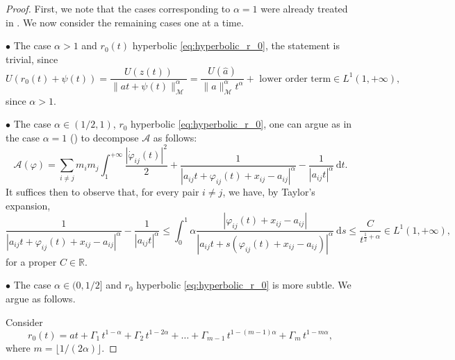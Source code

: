 \documentclass[a4paper,10pt]{amsart}
\newcommand{\numberset}{\mathbb}
\newcommand{\R}{\numberset{R}}
\newcommand{\ud}{\mathrm{d}}
\theoremstyle{plain}
\theoremstyle{definition}
\numberwithin{equation}{section}
\numberwithin{thm}{section}
\begin{document}
\begin{proof}
First, we note that the cases corresponding to $\alpha = 1$ were already treated in \cite{PolimeniTerracini}. We now consider the remaining cases one at a time. 

\noindent $\bullet$ The case $\alpha >1$ and $r_0(t)$ hyperbolic \eqref{eq:hyperbolic_r_0}, the statement is trivial, since
\[
U(r_0(t)+\psi(t)) = \frac{U(z(t))}{\|at + \psi(t)\|_\mathcal{M}^\alpha} = \frac{U(\hat a)}{\|a\|_\mathcal{M}^\alpha t^\alpha}+\mbox{ lower order term} \in L^1(1,+\infty),
\]
since $\alpha >1$.

\noindent $\bullet$
The case $\alpha \in (1/2,1)$, $r_0$ hyperbolic \eqref{eq:hyperbolic_r_0}, one can argue as in the case $\alpha=1$ (\cite{PolimeniTerracini}) to decompose $\mathcal{A}$ as follows:
\[
\mathcal{A}(\varphi)= \sum_{i\neq j}m_im_j \int_1^{+\infty} \frac{|\dot\varphi_{ij}(t)|^2}{2}+\frac{1}{|a_{ij}t + \varphi_{ij}(t) + x_{ij} - a_{ij}|^\alpha}-\frac{1}{|a_{ij}t|^\alpha}\,\ud t.
\]
It suffices then to observe that, for every pair $i\neq j$, we have, by Taylor's expansion,
\[
\frac{1}{|a_{ij}t + \varphi_{ij}(t) + x_{ij} - a_{ij}|^\alpha} - \frac{1}{|a_{ij}t|^\alpha} \le \int_{0}^{1}\alpha\frac{|\varphi_{ij}(t) + x_{ij} - a_{ij}|}{|a_{ij}t + s(\varphi_{ij}(t) + x_{ij} - a_{ij})|^\alpha}\ \ud s \le \frac{C}{t^{\frac{1}{2}+\alpha}}\in L^1(1,+\infty),
\]
for a proper $C\in\R$.



 

\smallskip
\noindent $\bullet$ The case $\alpha \in (0,1/2]$ and $r_0$ hyperbolic \eqref{eq:hyperbolic_r_0} is more subtle. We argue as follows. 

{Consider
\[
r_0(t)=at+\Gamma_1\,t^{1-\alpha}+\Gamma_2\,t^{1-2\alpha}+\dots+\Gamma_{m-1}\,t^{1-(m-1)\alpha}+\Gamma_m\,t^{1-m\alpha},
\]
where $m=\lfloor 1/(2\alpha)\rfloor$.

}
\end{proof}
\end{document}
